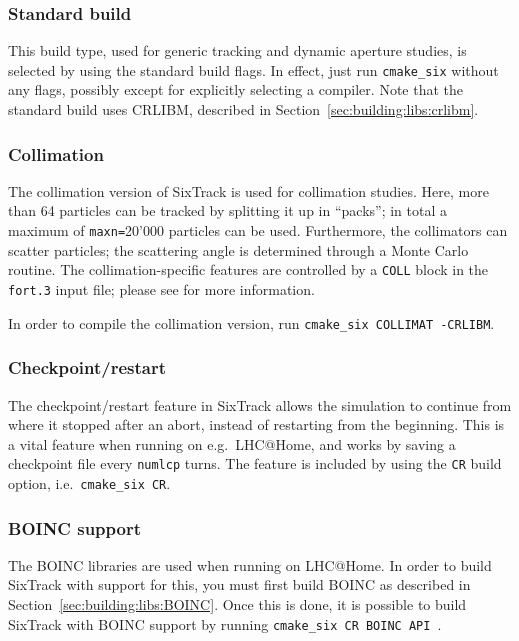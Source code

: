 \documentclass[english]{article}
\begin{document}
\subsubsection{Standard build}
This build type, used for generic tracking and dynamic aperture studies, is selected by using the standard build flags.
In effect, just run \texttt{cmake\_six} without any flags, possibly except for explicitly selecting a compiler.
Note that the standard build uses CRLIBM, described in Section~\ref{sec:building:libs:crlibm}.

\subsubsection{Collimation}
The collimation version of SixTrack is used for collimation studies.
Here, more than 64 particles can be tracked by splitting it up in ``packs''; in total a maximum of \texttt{maxn=}20'000 particles can be used.
Furthermore, the collimators can scatter particles; the scattering angle is determined through a Monte Carlo routine.
The collimation-specific features are controlled by a \texttt{COLL} block in the \texttt{fort.3} input file; please see  for more information.

In order to compile the collimation version, run \texttt{cmake\_six COLLIMAT -CRLIBM}.


\subsubsection{Checkpoint/restart}
The checkpoint/restart feature in SixTrack allows the simulation to continue from where it stopped after an abort, instead of restarting from the beginning.
This is a vital feature when running on e.g.\ LHC@Home, and works by saving a checkpoint file every \texttt{numlcp} turns.
The feature is included by using the \texttt{CR} build option, i.e.\ \texttt{cmake\_six CR}.

\subsubsection{BOINC support}
\label{sec:building:options:BOINC}
The BOINC libraries are used when running on LHC@Home.
In order to build SixTrack with support for this, you must first build BOINC as described in Section~\ref{sec:building:libs:BOINC}.
Once this is done, it is possible to build SixTrack with BOINC support by running \texttt{cmake\_six CR BOINC API}~.
\end{document}
